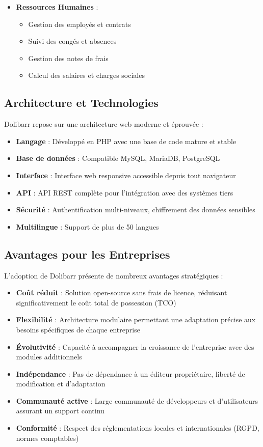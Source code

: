 \documentclass[12pt,a4paper]{report}
\begin{document}
\begin{itemize}
    \item \textbf{Ressources Humaines} :
    \begin{itemize}
        \item Gestion des employés et contrats
        \item Suivi des congés et absences
        \item Gestion des notes de frais
        \item Calcul des salaires et charges sociales
    \end{itemize}
\end{itemize}

\subsection{Architecture et Technologies}
Dolibarr repose sur une architecture web moderne et éprouvée :

\begin{itemize}
    \item \textbf{Langage} : Développé en PHP avec une base de code mature et stable
    \item \textbf{Base de données} : Compatible MySQL, MariaDB, PostgreSQL
    \item \textbf{Interface} : Interface web responsive accessible depuis tout navigateur
    \item \textbf{API} : API REST complète pour l'intégration avec des systèmes tiers
    \item \textbf{Sécurité} : Authentification multi-niveaux, chiffrement des données sensibles
    \item \textbf{Multilingue} : Support de plus de 50 langues
\end{itemize}

\subsection{Avantages pour les Entreprises}
L'adoption de Dolibarr présente de nombreux avantages stratégiques :

\begin{itemize}
    \item \textbf{Coût réduit} : Solution open-source sans frais de licence, réduisant significativement le coût total de possession (TCO)
    \item \textbf{Flexibilité} : Architecture modulaire permettant une adaptation précise aux besoins spécifiques de chaque entreprise
    \item \textbf{Évolutivité} : Capacité à accompagner la croissance de l'entreprise avec des modules additionnels
    \item \textbf{Indépendance} : Pas de dépendance à un éditeur propriétaire, liberté de modification et d'adaptation
    \item \textbf{Communauté active} : Large communauté de développeurs et d'utilisateurs assurant un support continu
    \item \textbf{Conformité} : Respect des réglementations locales et internationales (RGPD, normes comptables)
\end{itemize}
\end{document}
